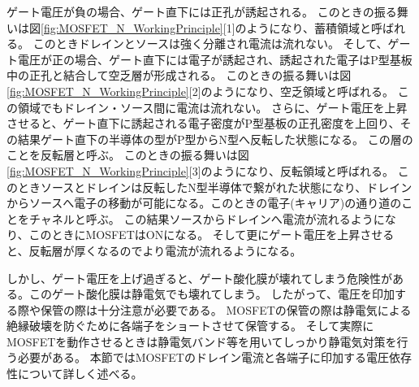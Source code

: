 		ゲート電圧が負の場合、ゲート直下には正孔が誘起される。
		このときの振る舞いは図\ref{fig:MOSFET_N_WorkingPrinciple}[1]のようになり、蓄積領域と呼ばれる。
		このときドレインとソースは強く分離され電流は流れない。
		そして、ゲート電圧が正の場合、ゲート直下には電子が誘起され、誘起された電子はP型基板中の正孔と結合して空乏層が形成される。
		このときの振る舞いは図\ref{fig:MOSFET_N_WorkingPrinciple}[2]のようになり、空乏領域と呼ばれる。
		この領域でもドレイン・ソース間に電流は流れない。
		さらに、ゲート電圧を上昇させると、ゲート直下に誘起される電子密度がP型基板の正孔密度を上回り、その結果ゲート直下の半導体の型がP型からN型へ反転した状態になる。
		この層のことを反転層と呼ぶ。
		このときの振る舞いは図\ref{fig:MOSFET_N_WorkingPrinciple}[3]のようになり、反転領域と呼ばれる。
		このときソースとドレインは反転したN型半導体で繋がれた状態になり、ドレインからソースへ電子の移動が可能になる。このときの電子(キャリア)の通り道のことをチャネルと呼ぶ。
		この結果ソースからドレインへ電流が流れるようになり、このときにMOSFETはONになる。
		そして更にゲート電圧を上昇させると、反転層が厚くなるのでより電流が流れるようになる。
		
		しかし、ゲート電圧を上げ過ぎると、ゲート酸化膜が壊れてしまう危険性がある。このゲート酸化膜は静電気でも壊れてしまう。
		したがって、電圧を印加する際や保管の際は十分注意が必要である。
		MOSFETの保管の際は静電気による絶縁破壊を防ぐために各端子をショートさせて保管する。
		そして実際にMOSFETを動作させるときは静電気バンド等を用いてしっかり静電気対策を行う必要がある。
		本節ではMOSFETのドレイン電流と各端子に印加する電圧依存性について詳しく述べる。
